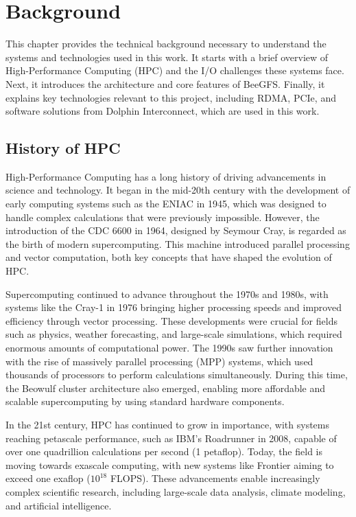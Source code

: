 \chapter{Background}
This chapter provides the technical background necessary to understand the systems and technologies used in this work. It starts with a brief overview of High-Performance Computing (HPC) and the I/O challenges these systems face. Next, it introduces the architecture and core features of BeeGFS. Finally, it explains key technologies relevant to this project, including RDMA, PCIe, and software solutions from Dolphin Interconnect, which are used in this work.

\section{History of HPC}
High-Performance Computing has a long history of driving advancements in science and technology. It began in the mid-20th century with the development of early computing systems such as the ENIAC in 1945, which was designed to handle complex calculations that were previously impossible. However, the introduction of the CDC 6600 in 1964, designed by Seymour Cray, is regarded as the birth of modern supercomputing.\cite{narayan2009supercomputers} This machine introduced parallel processing and vector computation, both key concepts that have shaped the evolution of HPC. 

Supercomputing continued to advance throughout the 1970s and 1980s, with systems like the Cray-1 in 1976 bringing higher processing speeds and improved efficiency through vector processing. These developments were crucial for fields such as physics, weather forecasting, and large-scale simulations, which required enormous amounts of computational power. The 1990s saw further innovation with the rise of massively parallel processing (MPP) systems, which used thousands of processors to perform calculations simultaneously. During this time, the Beowulf cluster architecture also emerged, enabling more affordable and scalable supercomputing by using standard hardware components.

In the 21st century, HPC has continued to grow in importance, with systems reaching petascale performance, such as \allowbreak IBM’s Roadrunner in 2008, capable of over one quadrillion calculations per second (1 petaflop). Today, the field is moving towards exascale computing, with new systems like Frontier aiming to exceed one exaflop ($10^{18}$ FLOPS).\cite{top500_2024} These advancements enable increasingly complex scientific research, including large-scale data analysis, climate modeling, and artificial intelligence.

